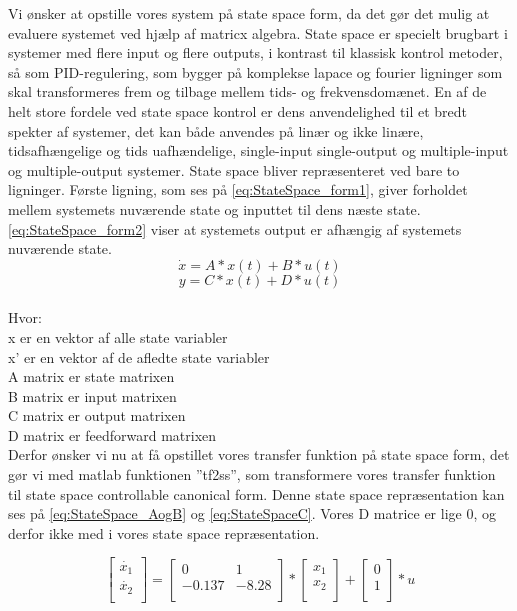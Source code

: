 Vi ønsker at opstille vores system på state space form, da det gør det mulig at evaluere systemet ved hjælp af matricx algebra. State space er specielt brugbart i systemer med flere input og flere outputs, i kontrast til klassisk kontrol metoder, så som PID-regulering, som bygger på komplekse lapace og fourier ligninger som skal transformeres frem og tilbage mellem tids- og frekvensdomænet. 
En af de helt store fordele ved state space kontrol er dens anvendelighed til et bredt spekter af systemer, det kan både anvendes på linær og ikke linære, tidsafhængelige og tids uafhændelige, single-input single-output og multiple-input og multiple-output systemer.
State space bliver repræsenteret ved bare to ligninger. Første ligning, som ses på \autoref{eq:StateSpace_form1}, giver forholdet mellem systemets nuværende state og inputtet til dens næste state. \autoref{eq:StateSpace_form2} viser at systemets output er afhængig af systemets nuværende state.
\begin{equation}
\dot{x} = A * x(t) + B * u(t)
\label{eq:StateSpace_form1}
\end{equation}
\begin{equation}
y = C * x(t) + D * u(t)
\label{eq:StateSpace_form2}
\end{equation}
\\
Hvor:\\
x er en vektor af alle state variabler\\
x' er en vektor af de afledte state variabler\\
A matrix er state matrixen  \\
B matrix er input matrixen \\
C matrix er output matrixen\\
D matrix er feedforward matrixen\\

Derfor ønsker vi nu at få opstillet vores transfer funktion på state space form, det gør vi med matlab funktionen ”tf2ss”, som transformere vores transfer funktion til state space controllable canonical form. Denne state space repræsentation kan ses på \autoref{eq:StateSpace_AogB} og \autoref{eq:StateSpaceC}. Vores D matrice er lige 0, og derfor ikke med i vores state space repræsentation.

\begin{equation}
	\begin{bmatrix}
	\dot{x_1}   \\
	\dot{x_2}   \\
	\end{bmatrix}
	=
	\begin{bmatrix}
	0       &  1  \\
	-0.137      & -8.28 \\
	\end{bmatrix}
	*
	\begin{bmatrix}
	x_1   \\
	x_2   \\
	\end{bmatrix}
	+
	\begin{bmatrix}
	0   \\
	1   \\
	\end{bmatrix}
		*
	u
	\label{eq:StateSpace_AogB}
\end{equation}


